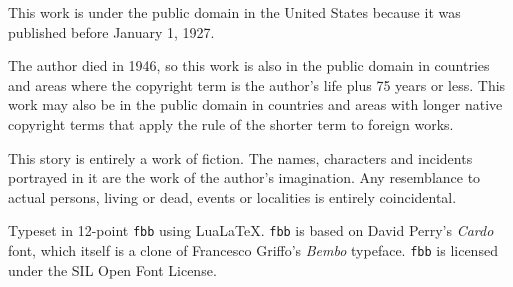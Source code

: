 \thispagestyle{empty}
\null\vfill
\begin{legalese}
\begin{parascale}[0.9]
\begin{center}
This work is under the public domain in the United States because it was published before January 1, 1927.

\null

The author died in 1946, so this work is also in the public domain in countries and areas where the copyright term is the author's life plus 75 years or less. This work may also be in the public domain in countries and areas with longer native copyright terms that apply the rule of the shorter term to foreign works.

\null

This story is entirely a work of fiction. The names, characters and incidents portrayed in it are the work of the author’s imagination. Any resemblance to actual persons, living or dead, events or localities is entirely coincidental.

\null

Typeset in 12-point \texttt{fbb} using Lua\LaTeX{}. \texttt{fbb} is based on David Perry’s \emph{Cardo} font, which itself is a clone of Francesco Griffo’s \emph{Bembo} typeface. \texttt{fbb} is licensed under the SIL Open Font License.
\end{center}
\end{parascale}
\end{legalese}
\cleartorecto